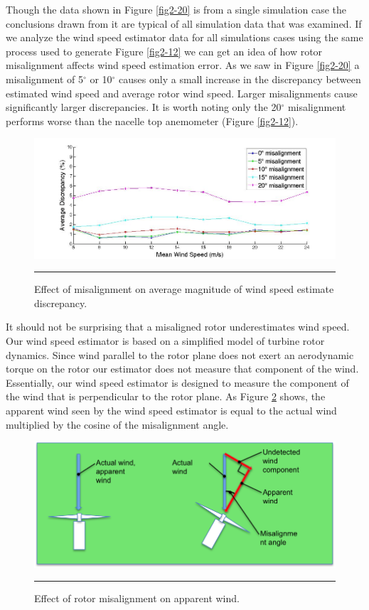 Though the data shown in Figure \ref{fig2-20} is from a single simulation case the conclusions drawn from it are typical of all simulation data that was examined. If we analyze the wind speed estimator data for all simulations cases using the same process used to generate Figure \ref{fig2-12} we can get an idea of how rotor misalignment affects wind speed estimation error. As we saw in Figure \ref{fig2-20} a misalignment of 5$^\circ$ or 10$^\circ$ causes only a small increase in the discrepancy between estimated wind speed and average rotor wind speed. Larger misalignments cause significantly larger discrepancies. It is worth noting only the 20$^\circ$ misalignment performs worse than the nacelle top anemometer (Figure \ref{fig2-12}).

\begin{figure}[htbp]
	\centering
		\includegraphics[trim = {3cm 0 2.5cm 0}, clip, width = \linewidth]{Figures/ch2Figures/fig2-21.jpg}
		\rule{35em}{0.5pt}
	\caption{Effect of misalignment on average magnitude of wind speed estimate discrepancy.}
	\label{fig2-21}
\end{figure}


It should not be surprising that a misaligned rotor underestimates wind speed. Our wind speed estimator is based on a simplified model of turbine rotor dynamics. Since wind parallel to the rotor plane does not exert an aerodynamic torque on the rotor our estimator does not measure that component of the wind. Essentially, our wind speed estimator is designed to measure the component of the wind that is perpendicular to the rotor plane. As Figure \ref{fig2-22} shows, the apparent wind seen by the wind speed estimator is equal to the actual wind multiplied by the cosine of the misalignment angle.

\begin{figure}[htbp]
	\centering
		\includegraphics[width=\textwidth]{Figures/ch2Figures/fig2-22.png}
		\rule{35em}{0.5pt}
	\caption{Effect of rotor misalignment on apparent wind.}
	\label{fig2-22}
\end{figure}

